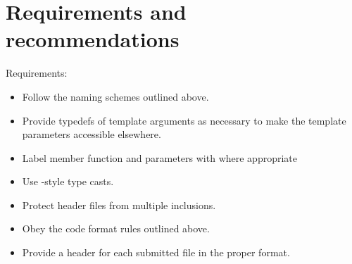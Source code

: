 \section{Requirements and recommendations\label{sec:code_format_doc_req_and_rec}}

\noindent
Requirements:
\begin{itemize}
   \item Follow the naming schemes outlined above.
   \item Provide typedefs of template arguments as necessary to make the
         template parameters accessible elsewhere.
   \item Label member function and parameters with  where 
         appropriate
   \item Use \CC-style type casts.
   \item Protect header files from multiple inclusions.
   \item Obey the code format rules outlined above.
   \item Provide a header for each submitted file in the proper format.
\end{itemize}
